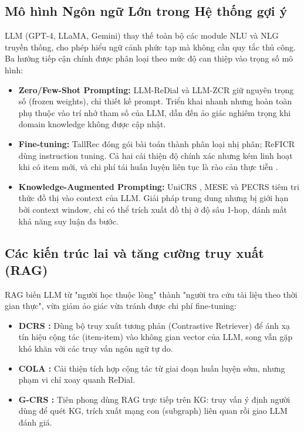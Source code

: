 \subsection{Mô hình Ngôn ngữ Lớn trong Hệ thống gợi ý}
LLM (GPT-4, LLaMA, Gemini) thay thế toàn bộ các module NLU và NLG truyền thống, cho phép hiểu ngữ cảnh phức tạp mà không cần quy tắc thủ công. Ba hướng tiếp cận chính được phân loại theo mức độ can thiệp vào trọng số mô hình:
\begin{itemize}
    \item \textbf{Zero/Few-Shot Prompting:} LLM-ReDial \cite{liang-etal-2024-llm} và LLM-ZCR \cite{he2023largelanguagemodels} giữ nguyên trọng số (frozen weights), chỉ thiết kế prompt. Triển khai nhanh nhưng hoàn toàn phụ thuộc vào trí nhớ tham số của LLM, dẫn đến ảo giác nghiêm trọng khi domain knowledge không được cập nhật.
    \item \textbf{Fine-tuning:} TallRec \cite{bao2023tallrec} đóng gói bài toán thành phân loại nhị phân; ReFICR \cite{yang-2024-reficr} dùng instruction tuning. Cả hai cải thiện độ chính xác nhưng kém linh hoạt khi có item mới, và chi phí tái huấn luyện liên tục là rào cản thực tiễn \cite{meng2025balancingfinetuning}.
    \item \textbf{Knowledge-Augmented Prompting:} UniCRS \cite{Wang_2022}, MESE \cite{yang-etal-2022-improving} và PECRS \cite{ravaut-etal-2024-parameter} tiêm tri thức đồ thị vào context của LLM. Giải pháp trung dung nhưng bị giới hạn bởi context window, chỉ có thể trích xuất đồ thị ở độ sâu 1-hop, đánh mất khả năng suy luận đa bước.
\end{itemize}

\subsection{Các kiến trúc lai và tăng cường truy xuất (RAG)}
RAG biến LLM từ "người học thuộc lòng" thành "người tra cứu tài liệu theo thời gian thực", vừa giảm ảo giác vừa tránh được chi phí fine-tuning:
\begin{itemize}
    \item \textbf{DCRS \cite{dao2024broadening}:} Dùng bộ truy xuất tương phản (Contrastive Retriever) để ánh xạ tín hiệu cộng tác (item-item) vào không gian vector của LLM, song vẫn gặp khó khăn với các truy vấn ngôn ngữ tự do.
    \item \textbf{COLA \cite{Lin_Wang_Li_2023}:} Cải thiện tích hợp cộng tác từ giai đoạn huấn luyện sớm, nhưng phạm vi chỉ xoay quanh ReDial.
    \item \textbf{G-CRS \cite{qiu2025graphragllm}:} Tiên phong dùng RAG trực tiếp trên KG: truy vấn ý định người dùng để quét KG, trích xuất mạng con (subgraph) liên quan rồi giao LLM đánh giá.
\end{itemize}

